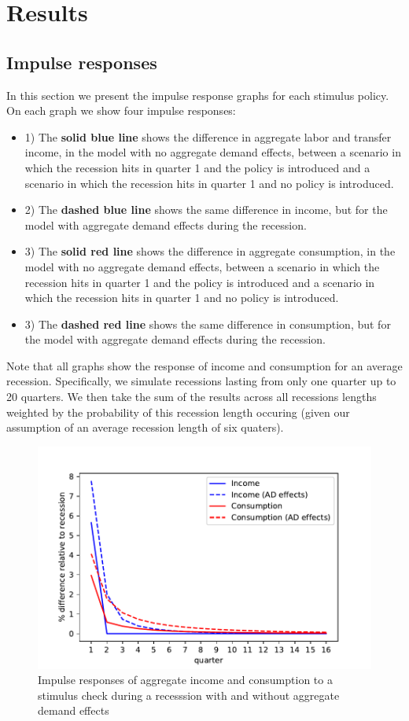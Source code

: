 \documentclass[../HAFiscal]{subfiles}
\begin{document}
\section{Results}


\subsection{Impulse responses}
In this section we present the impulse response graphs for each stimulus policy. On each graph we show four impulse responses:
\begin{itemize}
	\item 1) The \textbf{solid blue line} shows the difference in aggregate labor and transfer income, in the model with no aggregate demand effects, between a scenario in which the recession hits in quarter 1 and the policy is introduced and a scenario in which the recession hits in quarter 1 and no policy is introduced.
	\item 2) The \textbf{dashed blue line} shows the same difference in income, but for the model with aggregate demand effects during the recession.
	\item 3) The \textbf{solid red line} shows the difference in aggregate consumption, in the model with no aggregate demand effects, between a scenario in which the recession hits in quarter 1 and the policy is introduced and a scenario in which the recession hits in quarter 1 and no policy is introduced.
	\item 3) The \textbf{dashed red line} shows the same difference in consumption, but for the model with aggregate demand effects during the recession.
\end{itemize}

Note that all graphs show the response of income and consumption for an average recession. Specifically, we simulate recessions lasting from only one quarter up to 20 quarters. We then take the sum of the results across all recessions lengths weighted by the probability of this recession length occuring (given our assumption of an average recession length of six quaters).

\begin{figure}
	\centering
	\includegraphics[width=0.8\linewidth]{Code/HA-Models/FromPandemicCode/Figures/recession_Check_relrecession}
	\caption{Impulse responses of aggregate income and consumption to a stimulus check during a recesssion with and without aggregate demand effects}
	\label{fig:recessioncheckrelrecession}
\end{figure}
\end{document}
